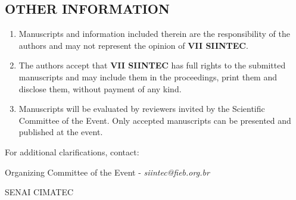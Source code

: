 \documentclass[
	article,			%
	12pt,				%
	oneside,			%
	a4paper,			%
	english,			%
	brazil,				%
	sumario=tradicional
	]{abntex2}
\begin{document}
\begin{apendicesenv}

\section*{OTHER INFORMATION}
\begin{enumerate}[label=\alph*)]
   \item Manuscripts and information included therein are the responsibility of the authors and may not represent the opinion of \textbf{VII SIINTEC}.
   \item The authors accept that \textbf{VII SIINTEC} has full rights to the submitted manuscripts and may include them in the proceedings, print them and disclose them, without payment of any kind.
   \item Manuscripts will be evaluated by reviewers invited by the Scientific Committee of the Event. Only accepted manuscripts can be presented and published at the event.
\end{enumerate}

\raggedright For additional clarifications, contact:

Organizing Committee of the Event - \textit{siintec@fieb.org.br}

SENAI CIMATEC

\end{apendicesenv}



\end{document}
